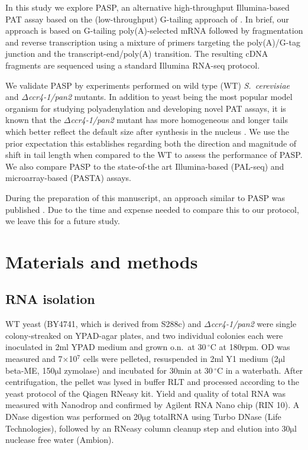 \documentclass[10pt]{article}
\newcommand{\mul}{\ensuremath{\mathrm{\mu l}}}
\newcommand{\C}{\,$^{\circ}\mathrm{C}$}
\begin{document}
In this study we explore PASP, an alternative high-throughput Illumina-based PAT assay based on the (low-throughput) G-tailing approach of \cite{kusov01}. In brief, our approach is based on G-tailing poly(A)-selected mRNA followed by fragmentation and reverse transcription using a mixture of primers targeting the poly(A)/G-tag junction and the transcript-end/poly(A) transition. The resulting cDNA fragments are sequenced using a standard Illumina RNA-seq protocol.

We validate PASP by experiments performed on wild type (WT) \textit{S.~cerevisiae} and \textit{$\Delta$ccr4-1/pan2} mutants. In addition to yeast being the most popular model organism for studying polyadenylation and developing novel PAT assays, it is known that the \textit{$\Delta$ccr4-1/pan2} mutant has more homogeneous and longer tails which better reflect the default size after synthesis in the nucleus \cite{beilharz07,traven05}. We use the prior expectation this establishes regarding both the direction and magnitude of shift in tail length when compared to the WT to assess the performance of PASP. We also compare PASP to the state-of-the art Illumina-based (PAL-seq) and microarray-based (PASTA) assays.

During the preparation of this manuscript, an approach similar to PASP was published \cite{harrison15}. Due to the time and expense needed to compare this to our protocol, we leave this for a future study.

\section*{Materials and methods}

\subsection*{RNA isolation}

WT yeast (BY4741, which is derived from S288c) and \textit{$\Delta$ccr4-1/pan2} \cite{beilharz07} were single colony-streaked on YPAD-agar plates, and two individual colonies each were inoculated in 2ml YPAD medium and grown o.n.\ at 30{\C} at 180rpm. 
OD was measured and 7$\times$10$^7$ cells were pelleted, resuspended in 2ml Y1 medium (2{\mul} beta-ME, 150{\mul} zymolase) and incubated for 30min at 30{\C} in a waterbath. After centrifugation, the pellet was lysed in buffer RLT and processed according to the yeast protocol of the Qiagen RNeasy kit. Yield and quality of total RNA was measured with Nanodrop and confirmed by Agilent RNA Nano chip (RIN 10). A DNase digestion was performed on 20$\mathrm{\mu g}$ totalRNA using Turbo DNase (Life Technologies), followed by an RNeasy column cleanup step and elution into 30{\mul} nuclease free water (Ambion).
\end{document}
